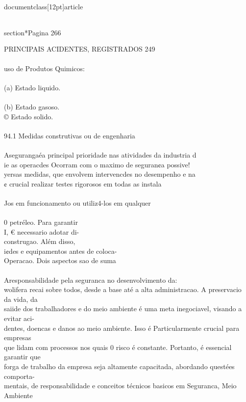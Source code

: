 \\documentclass[12pt]{article}
\begin{document}
{{{{{\\section*{Pagina 266}

PRINCIPAIS ACIDENTES, REGISTRADOS 249\\
\\
uso de Produtos Quimicos:\\
\\
(a) Estado liquido.\\
\\
(b) Estado gasoso.\\
© Estado solido.\\
\\
94.1 Medidas construtivas ou de engenharia\\
\\
Asegurangaéa principal prioridade nas atividades da industria d\\
ie as operacdes Ocorram com o maximo de seguran¢a possive!\\
yersas medidas, que envolvem intervencdes no desempenho e na\\
¢ crucial realizar testes rigorosos em todas as instala\\
\\
Jos em funcionamento ou utiliz4-los em qualquer\\
\\
0 petréleo. Para garantir\\
I, € necessario adotar di-\\
construgao. Além disso,\\
i¢des e equipamentos antes de coloca-\\
Operacao. Dois aspectos sao de suma\\
\\
Aresponsabilidade pela seguranca no desenvolvimento da:\\
wolifera recai sobre todos, desde a base até a alta administracao. A preservacio da vida, da\\
saiide dos trabalhadores e do meio ambiente é uma meta inegociavel, visando a evitar aci-\\
dentes, doencas e danos ao meio ambiente. Isso é Particularmente crucial para empresas\\
que lidam com processos nos quais 0 risco é constante. Portanto, é essencial garantir que\\
forga de trabalho da empresa seja altamente capacitada, abordando questées comporta-\\
mentais, de responsabilidade e conceitos técnicos basicos em Seguranca, Meio Ambiente\\
}}}}}
\end{document}
